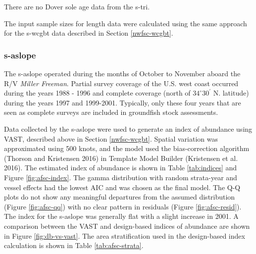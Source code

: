 \documentclass[11pt,
  english,
  a4paper,
]{article}
\begin{document}
\leavevmode\tagmcend\tagstructend\par


There are no Dover sole age data from the \gls{s-tri}.

\leavevmode\tagmcend\tagstructend\par


The input sample sizes for length data were calculated using the same approach for the \gls{s-wcgbt} data described in Section \ref{nwfsc-wcgbt}.

\leavevmode\tagmcend\tagstructend\par


\hypertarget{section-1}{%
\subsubsection{\texorpdfstring{\acrlong{s-aslope}}{}}\label{section-1}}

\leavevmode\tagmcend\tagstructend


The \gls{s-aslope} operated during the months of October to November aboard the R/V \emph{Miller Freeman}. Partial survey coverage of the U.S. west coast occurred during the years 1988 - 1996 and complete coverage (north of {\(34^\circ 30^\prime\)\leavevmode\tagmcend\tagstructend} N. latitude) during the years 1997 and 1999-2001. Typically, only these four years that are seen as complete surveys are included in groundfish stock assessments.

\leavevmode\tagmcend\tagstructend\par


Data collected by the \gls{s-aslope} were used to generate an index of abundance using VAST, described above in Section \ref{nwfsc-wcgbt}. Spatial variation was approximated using 500 knots, and the model used the bias-correction algorithm {(Thorson and Kristensen 2016)\leavevmode\tagmcend\tagstructend} in Template Model Builder {(Kristensen et al. 2016)\leavevmode\tagmcend\tagstructend}. The estimated index of abundance is shown in Table \ref{tab:indices} and Figure \ref{fig:afsc-index}. The gamma distribution with random strata-year and vessel effects had the lowest AIC and was chosen as the final model. The Q-Q plots do not show any meaningful departures from the assumed distribution (Figure \ref{fig:afsc-qq}) with no clear pattern in residuals (Figure \ref{fig:afsc-resid}). The index for the \gls{s-aslope} was generally flat with a slight increase in 2001. A comparison between the VAST and design-based indices of abundance are shown in Figure \ref{fig:db-vs-vast}. The area stratification used in the design-based index calculation is shown in Table \ref{tab:afsc-strata}.
\end{document}
